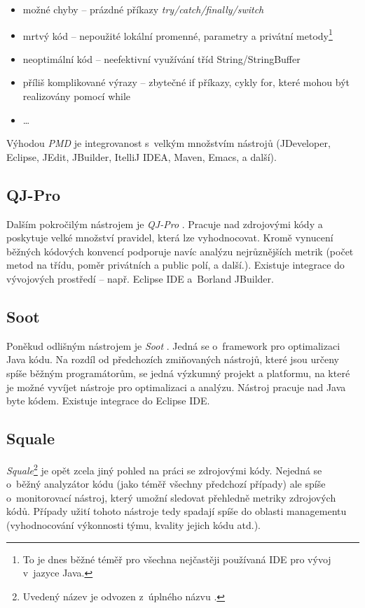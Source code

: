 \begin{itemize}
\item možné chyby -- prázdné příkazy \emph{try/catch/finally/switch}
\item mrtvý kód -- nepoužité lokální promenné, parametry a privátní metody\footnote{To je dnes běžné téměř pro všechna nejčastěji používaná IDE pro vývoj v~jazyce Java.}
\item neoptimální kód -- neefektivní využívání tříd String/StringBuffer
\item příliš komplikované výrazy -- zbytečné if příkazy, cykly for, které mohou být realizovány pomocí while
\item \ldots
\end{itemize}

Výhodou \emph{PMD} je integrovanost s~velkým množstvím nástrojů (JDeveloper, Eclipse, JEdit, JBuilder, ItelliJ IDEA, Maven, Emacs, a další).

\subsection{QJ-Pro}
Dalším pokročilým nástrojem je \emph{QJ-Pro} \cite{existingtools:qjpro}. Pracuje nad zdrojovými kódy a poskytuje velké množství pravidel, která lze vyhodnocovat. Kromě vynucení běžných kódových konvencí podporuje navíc analýzu nejrůznějších metrik (počet metod na třídu, poměr privátních a public polí, a další.). Existuje integrace do vývojových prostředí -- např. Eclipse IDE a~Borland JBuilder.

\subsection{Soot}
Poněkud odlišným nástrojem je \emph{Soot} \cite{existingtools:soot}. Jedná se o~framework pro optimalizaci Java kódu. Na rozdíl od předchozích zmiňovaných nástrojů, které jsou určeny spíše běžným programátorům, se jedná výzkumný projekt a platformu, na které je možné vyvíjet nástroje pro optimalizaci a analýzu. Nástroj pracuje nad Java byte kódem. Existuje integrace do Eclipse IDE.

\subsection{Squale}
\emph{Squale}\footnote{Uvedený název je odvozen z~úplného názvu .} \cite{existingtools:squale} je opět zcela jiný pohled na práci se zdrojovými kódy. Nejedná se o~běžný analyzátor kódu (jako téměř všechny předchozí případy) ale spíše o~monitorovací nástroj, který umožní sledovat přehledně metriky zdrojových kódů. Případy užití tohoto nástroje tedy spadají spíše do oblasti managementu (vyhodnocování výkonnosti týmu, kvality jejich kódu atd.).
